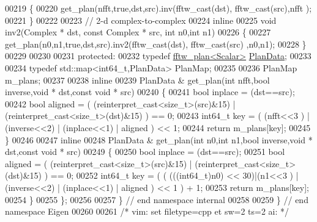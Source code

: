 \begin{DoxyCode}
00219       \{
00220         get\_plan(nfft,\textcolor{keyword}{true},dst,src).inv(fftw\_cast(dst), fftw\_cast(src),nfft );
00221       \}
00222 
00223       \textcolor{comment}{// 2-d complex-to-complex}
00224       \textcolor{keyword}{inline}
00225       \textcolor{keywordtype}{void} inv2(Complex * dst, \textcolor{keyword}{const} Complex * src, \textcolor{keywordtype}{int} n0,\textcolor{keywordtype}{int} n1)
00226       \{
00227         get\_plan(n0,n1,\textcolor{keyword}{true},dst,src).inv2(fftw\_cast(dst), fftw\_cast(src) ,n0,n1);
00228       \}
00229 
00230 
00231   \textcolor{keyword}{protected}:
00232       \textcolor{keyword}{typedef} \hyperlink{struct_eigen_1_1internal_1_1fftw__plan}{fftw\_plan<Scalar>} \hyperlink{struct_eigen_1_1internal_1_1fftw__plan}{PlanData};
00233 
00234       \textcolor{keyword}{typedef} std::map<int64\_t,PlanData> PlanMap;
00235 
00236       PlanMap m\_plans;
00237 
00238       \textcolor{keyword}{inline}
00239       PlanData & get\_plan(\textcolor{keywordtype}{int} nfft,\textcolor{keywordtype}{bool} inverse,\textcolor{keywordtype}{void} * dst,\textcolor{keyword}{const} \textcolor{keywordtype}{void} * src)
00240       \{
00241           \textcolor{keywordtype}{bool} inplace = (dst==src);
00242           \textcolor{keywordtype}{bool} aligned = ( (\textcolor{keyword}{reinterpret\_cast<}\textcolor{keywordtype}{size\_t}\textcolor{keyword}{>}(src)&15) | (\textcolor{keyword}{reinterpret\_cast<}\textcolor{keywordtype}{size\_t}\textcolor{keyword}{>}(dst)&15) ) == 0;
00243           int64\_t key = ( (nfft<<3 ) | (inverse<<2) | (inplace<<1) | aligned ) << 1;
00244           \textcolor{keywordflow}{return} m\_plans[key];
00245       \}
00246 
00247       \textcolor{keyword}{inline}
00248       PlanData & get\_plan(\textcolor{keywordtype}{int} n0,\textcolor{keywordtype}{int} n1,\textcolor{keywordtype}{bool} inverse,\textcolor{keywordtype}{void} * dst,\textcolor{keyword}{const} \textcolor{keywordtype}{void} * src)
00249       \{
00250           \textcolor{keywordtype}{bool} inplace = (dst==src);
00251           \textcolor{keywordtype}{bool} aligned = ( (\textcolor{keyword}{reinterpret\_cast<}\textcolor{keywordtype}{size\_t}\textcolor{keyword}{>}(src)&15) | (\textcolor{keyword}{reinterpret\_cast<}\textcolor{keywordtype}{size\_t}\textcolor{keyword}{>}(dst)&15) ) == 0;
00252           int64\_t key = ( ( (((int64\_t)n0) << 30)|(n1<<3 ) | (inverse<<2) | (inplace<<1) | aligned ) << 1 )
       + 1;
00253           \textcolor{keywordflow}{return} m\_plans[key];
00254       \}
00255   \};
00256 
00257 \} \textcolor{comment}{// end namespace internal}
00258 
00259 \} \textcolor{comment}{// end namespace Eigen}
00260 
00261 \textcolor{comment}{/* vim: set filetype=cpp et sw=2 ts=2 ai: */}
\end{DoxyCode}
